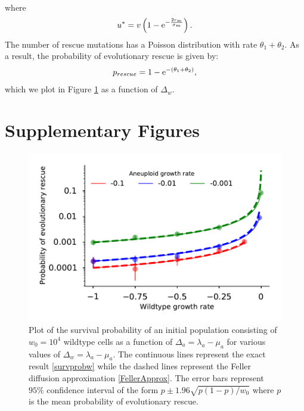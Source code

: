 \documentclass[12pt]{extarticle}
\newcommand{\e}{{\rm e}}
\newcommand{\beginsupplement}{%
      	\setcounter{table}{0}
        \renewcommand{\thetable}{S\arabic{table}}%
        \setcounter{figure}{0}
        \renewcommand{\thefigure}{S\arabic{figure}}%
		\setcounter{equation}{0}
        \renewcommand{\theequation}{A\arabic{equation}}%
}
\begin{document}
\begin{appendices}
\begin{align*}
\end{align*}
where
\begin{equation}
u^*=v\left(1-\e^{-\frac{2r_m}{\sigma_m}}\right).
\end{equation}
The number of rescue mutations has a Poisson distribution with rate $\theta_1+\theta_2$. As a result, the probability of evolutionary rescue is given by:
\begin{equation}\label{FellerApprox}
p_{rescue}=1-\e^{-\left(\theta_1+\theta_2\right)},
\end{equation}
which we plot in Figure \ref{P_est_diffusion} as a function of $\Delta_w$.
\end{appendices}

\newpage
\section*{Supplementary Figures}
\beginsupplement %
\begin{figure}[!t]
 \vspace*{1\baselineskip}
\includegraphics[width=1\textwidth]{Figures/P_est_diffusion.pdf}
\caption{Plot of the survival probability of an initial population consisting of $w_0=10^{4}$ wildtype cells as a function of $\Delta_a=\lambda_a-\mu_a$ for various values of $\Delta_w=\lambda_a-\mu_a$. The continuous lines represent the exact result \eqref{survprobw} while the dashed lines represent the Feller diffusion approximation \eqref{FellerApprox}. The error bars represent $95\%$ confidence interval of the form $p\pm1.96\sqrt{p\left(1-p\right)/w_0}$ where $p$ is the mean probability of evolutionary rescue.}
\label{P_est_diffusion}
\end{figure}
\end{document}
